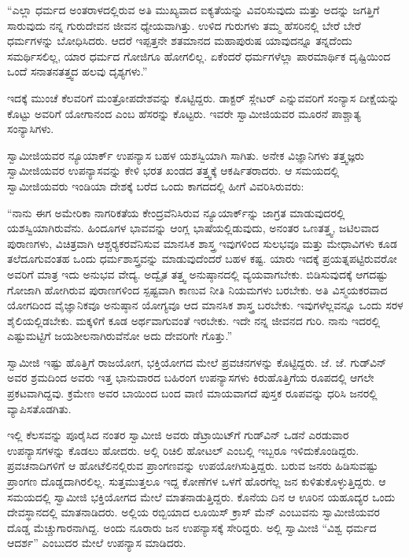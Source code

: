 “ಎಲ್ಲಾ ಧರ್ಮದ ಅಂತರಾಳದಲ್ಲಿರುವ ಅತಿ ಮುಖ್ಯವಾದ ಐಕ್ಯತೆಯನ್ನು ವಿವರಿಸುವುದು ಮತ್ತು ಅದನ್ನು ಜಗತ್ತಿಗೆ ಸಾರುವುದು ನನ್ನ ಗುರುದೇವನ ಜೀವನ ಧ್ಯೇಯವಾಗಿತ್ತು. ಉಳಿದ ಗುರುಗಳು ತಮ್ಮ ಹೆಸರಿನಲ್ಲಿ ಬೇರೆ ಬೇರೆ ಧರ್ಮಗಳನ್ನು ಬೋಧಿಸಿದರು. ಆದರೆ ಇಪ್ಪತ್ತನೇ ಶತಮಾನದ ಮಹಾಪುರುಷ ಯಾವುದನ್ನೂ ತನ್ನದೆಂದು ಸಮರ್ಥಿಸಲಿಲ್ಲ, ಯಾರ ಧರ್ಮದ ಗೋಜಿಗೂ ಹೋಗಲಿಲ್ಲ. ಏಕೆಂದರೆ ಧರ್ಮಗಳೆಲ್ಲಾ ಪಾರಮಾರ್ಥಿಕ ದೃಷ್ಟಿಯಿಂದ ಒಂದೆ ಸನಾತನತತ್ತ್ವದ ಹಲವು ದೃಶ್ಯಗಳು.” 

 ಇದಕ್ಕೆ ಮುಂಚೆ ಕೆಲವರಿಗೆ ಮಂತ್ರೋಪದೇಶವನ್ನು ಕೊಟ್ಟಿದ್ದರು. ಡಾಕ್ಟರ್ ಸ್ಲೇಟರ್ ಎನ್ನುವವರಿಗೆ ಸಂನ್ಯಾಸ ದೀಕ್ಷೆಯನ್ನು ಕೊಟ್ಟು ಅವರಿಗೆ ಯೋಗಾನಂದ ಎಂಬ ಹೆಸರನ್ನು ಕೊಟ್ಟರು. ಇವರೇ ಸ್ವಾಮೀಜಿಯವರ ಮೂರನೆ ಪಾಶ್ಚಾತ್ಯ ಸಂನ್ಯಾಸಿಗಳು. 

 ಸ್ವಾಮೀಜಿಯವರ ನ್ಯೂಯಾರ್ಕ್ ಉಪನ್ಯಾಸ ಬಹಳ ಯಶಸ್ವಿಯಾಗಿ ಸಾಗಿತು. ಅನೇಕ ವಿಜ್ಞಾನಿಗಳು ತತ್ತ್ವಜ್ಞರು ಸ್ವಾಮೀಜಿಯವರ ಉಪನ್ಯಾಸವನ್ನು ಕೇಳಿ ಭರತ ಖಂಡದ ತತ್ತ್ವಕ್ಕೆ ಆಕರ್ಷಿತರಾದರು. ಆ ಸಮಯದಲ್ಲಿ ಸ್ವಾಮೀಜಿಯವರು ಇಂಡಿಯಾ ದೇಶಕ್ಕೆ ಬರೆದ ಒಂದು ಕಾಗದದಲ್ಲಿ ಹೀಗೆ ವಿವರಿಸಿರುವರು: 

 “ನಾನು ಈಗ ಅಮೇರಿಕಾ ನಾಗರಿಕತೆಯ ಕೇಂದ್ರವೆನಿಸಿರುವ ನ್ಯೂಯಾರ್ಕ್‍ನ್ನು ಜಾಗ್ರತ ಮಾಡುವುದರಲ್ಲಿ ಯಶಸ್ವಿಯಾಗಿರುವೆನು. ಹಿಂದೂಗಳ ಭಾವವನ್ನು ಆಂಗ್ಲ ಭಾಷೆಯಲ್ಲಿಡುವುದು, ಅನಂತರ ಒಣತತ್ತ್ವ, ಜಟಿಲವಾದ ಪುರಾಣಗಳು, ವಿಚಿತ್ರವಾಗಿ ಆಶ್ಚರ‍್ಯಕರವೆನಿಸುವ ಮಾನಸಿಕ ಶಾಸ್ತ್ರ ಇವುಗಳಿಂದ ಸುಲಭವೂ ಮತ್ತು ಮೇಧಾವಿಗಳು ಕೂಡ ತಲೆದೂಗುವಂತಹ ಒಂದು ಧರ್ಮಶಾಸ್ತ್ರವನ್ನು ಮಾಡುವುದೆಂದರೆ ಬಹಳ ಕಷ್ಟ. ಯಾರು ಇದಕ್ಕೆ ಪ್ರಯತ್ನಪಟ್ಟಿರುವರೋ ಅವರಿಗೆ ಮಾತ್ರ ಇದು ಅನುಭವ ವೇದ್ಯ. ಅದ್ವೈತ ತತ್ತ್ವ ಅನುಷ್ಠಾನದಲ್ಲಿ ವ್ಯಯವಾಗಬೇಕು. ಬಿಡಿಸುವುದಕ್ಕೆ ಆಗದಷ್ಟು ಗೋಜಾಗಿ ಹೋಗಿರುವ ಪುರಾಣಗಳಿಂದ ಸ್ಪಷ್ಟವಾಗಿ ಕಾಣುವ ನೀತಿ ನಿಯಮಗಳು ಬರಬೇಕು. ಅತಿ ವಿಸ್ಮಯಕರವಾದ ಯೋಗದಿಂದ ವೈಜ್ಞಾನಿಕವೂ ಅನುಷ್ಠಾನ ಯೋಗ್ಯವೂ ಆದ ಮಾನಸಿಕ ಶಾಸ್ತ್ರ ಬರಬೇಕು. ಇವುಗಳೆಲ್ಲವನ್ನೂ ಒಂದು ಸರಳ ಶೈಲಿಯಲ್ಲಿಡಬೇಕು. ಮಕ್ಕಳಿಗೆ ಕೂಡ ಅರ್ಥವಾಗುವಂತೆ ಇರಬೇಕು. ಇದೇ ನನ್ನ ಜೀವನದ ಗುರಿ. ನಾನು ಇದರಲ್ಲಿ ಎಷ್ಟುಮಟ್ಟಿಗೆ ಜಯಶೀಲನಾಗಿರುವೆನೋ ಅದು ದೇವರಿಗೇ ಗೊತ್ತು.” 

 ಸ್ವಾಮೀಜಿ ಇಷ್ಟು ಹೊತ್ತಿಗೆ ರಾಜಯೋಗ, ಭಕ್ತಿಯೋಗದ ಮೇಲೆ ಪ್ರವಚನಗಳನ್ನು ಕೊಟ್ಟಿದ್ದರು. ಜೆ. ಜೆ. ಗುಡ್‍ವಿನ್ ಅವರ ಶ್ರಮದಿಂದ ಅವರು ಇತ್ತ ಭಾನುವಾರದ ಬಹಿರಂಗ ಉಪನ್ಯಾಸಗಳು ಕಿರುಹೊತ್ತಿಗೆಯ ರೂಪದಲ್ಲಿ ಆಗಲೇ ಪ್ರಕಟವಾಗಿದ್ದವು. ಕ್ರಮೇಣ ಅವರ ಬಾಯಿಂದ ಬಂದ ವಾಣಿ ಮಾಯವಾಗದೆ ಪುಸ್ತಕ ರೂಪವನ್ನು ಧರಿಸಿ ಜನರಲ್ಲಿ ವ್ಯಾಪಿಸತೊಡಗಿತು. 

 ಇಲ್ಲಿ ಕೆಲಸವನ್ನು ಪೂರೈಸಿದ ನಂತರ ಸ್ವಾಮೀಜಿ ಅವರು ಡೆಟ್ರಾಯಿಟ್‍ಗೆ ಗುಡ್‍ವಿನ್ ಒಡನೆ ಎರಡುವಾರ ಉಪನ್ಯಾಸಗಳನ್ನು ಕೊಡಲು ಹೋದರು. ಅಲ್ಲಿ ರಿಚಿಲಿ ಹೋಟಲ್ ಎಂಬಲ್ಲಿ ಇಬ್ಬರೂ ಇಳಿದುಕೊಂಡಿದ್ದರು. ಪ್ರವಚನಾದಿಗಳಿಗೆ ಆ ಹೋಟೆಲಿನಲ್ಲಿರುವ ಪ್ರಾಂಗಣವನ್ನು ಉಪಯೋಗಿಸುತ್ತಿದ್ದರು. ಬರುವ ಜನರು ಹಿಡಿಸುವಷ್ಟು ಪ್ರಾಂಗಣ ದೊಡ್ಡದಾಗಿರಲಿಲ್ಲ. ಸುತ್ತಮುತ್ತಲೂ ಇದ್ದ ಕೋಣೆಗಳ ಒಳಗೆ ಹೊರಗೆಲ್ಲ ಜನ ಕುಳಿತುಕೊಳ್ಳುತ್ತಿದ್ದರು. ಆ ಸಮಯದಲ್ಲಿ ಸ್ವಾಮೀಜಿ ಭಕ್ತಿಯೋಗದ ಮೇಲೆ ಮಾತನಾಡುತ್ತಿದ್ದರು. ಕೊನೆಯ ದಿನ ಆ ಊರಿನ ಯಹೂದ್ಯರ ಒಂದು ದೇವಸ್ಥಾನದಲ್ಲಿ ಮಾತನಾಡಿದರು. ಅಲ್ಲಿಯ ರಬ್ಬಿಯಾದ ಲೂಯಿಸ್ ಕ್ರಾಸ್ ಮೆನ್ ಎಂಬುವನು ಸ್ವಾಮೀಜಿಯವರ ದೊಡ್ಡ ಮೆಚ್ಚುಗಾರನಾಗಿದ್ದ. ಅಂದು ನೂರಾರು ಜನ ಉಪನ್ಯಾಸಕ್ಕೆ ಸೇರಿದ್ದರು. ಅಲ್ಲಿ ಸ್ವಾಮೀಜಿ “ವಿಶ್ವ ಧರ್ಮದ ಆದರ್ಶ” ಎಂಬುದರ ಮೇಲೆ ಉಪನ್ಯಾಸ ಮಾಡಿದರು. 


